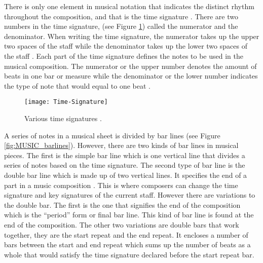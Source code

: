 	There is only one element in musical notation that indicates the distinct rhythm throughout the composition, and that is the time signature \citep{rivadelo1986fundamentals}. There are two numbers in the time signature, (see Figure \ref{fig:MUSIC_timesignature}) called the numerator and the denominator. When writing the time signature, the numerator takes up the upper two spaces of the staff while the denominator takes up the lower two spaces of the staff \citep{read1969music}. Each part of the time signature defines the notes to be used in the musical composition. The numerator or the upper number denotes the amount of beats in one bar or measure while the denominator or the lower number indicates the type of note that would equal to one beat \citep{read1969music, rivadelo1986fundamentals,burrows1999reading}.

    
\begin{figure}[H]
	\centering
	\texttt{[image: Time-Signature]}
    \caption{Various time signatures \citep{rose2014reading}.} 
    \label{fig:MUSIC_timesignature}
\end{figure}

A series of notes in a musical sheet is divided by bar lines (see Figure \ref{fig:MUSIC_barlines}). However, there are two kinds of bar lines in musical pieces. The first is the simple bar line which is one vertical line that divides a series of notes based on the time signature. The second type of bar line is the double bar line which is made up of two vertical lines. It specifies the end of a part in a music composition \citep{read1969music}. This is where composers can change the time signature and key signatures of the current staff. However there are variations to the double bar. The first is the one that signifies the end of the composition which is the ``period'' form \citep{read1969music} or final bar line. This kind of bar line is found at the end of the composition. The other two variations are double bars that work together, they are the start repeat and the end repeat. It encloses a number of bars between the start and end repeat which sums up the number of beats as a whole that would satisfy the time signature declared before the start repeat bar.
    
